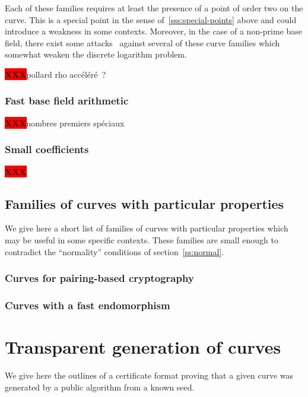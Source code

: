 \documentclass{article}
\def\XXX{{\colorbox{red}{{\color{white}\bfseries XXX}}}}
\begin{document}
Each of these families requires at least
the presence of a point of order two on the curve.
This is a special point in the sense of~\ref{sss:special-points} above
and could introduce a weakness in some contexts.
Moreover, in the case of a non-prime base field,
there exist some attacks~\cite{jcrypto2014fghr}
against several of these curve families
which somewhat weaken the discrete logarithm problem.

\XXX pollard rho accéléré ?

\subsubsection{Fast base field arithmetic}
\label{sss:special-fast}

\XXX nombres premiers spéciaux

\subsubsection{Small coefficients}

\XXX

\subsection{Families of curves with particular properties}
\label{ss:particular}

We give here a short list of families of curves
with particular properties which may be useful in some specific contexts.
These families are small enough
to contradict the ``normality'' conditions of section~\ref{ss:normal}.

\subsubsection{Curves for pairing-based cryptography}

\subsubsection{Curves with a fast endomorphism}


\section{Transparent generation of curves}
\label{s:certif}

We give here the outlines of a certificate format
proving that a given curve was generated by a public algorithm
from a known seed.
\end{document}
